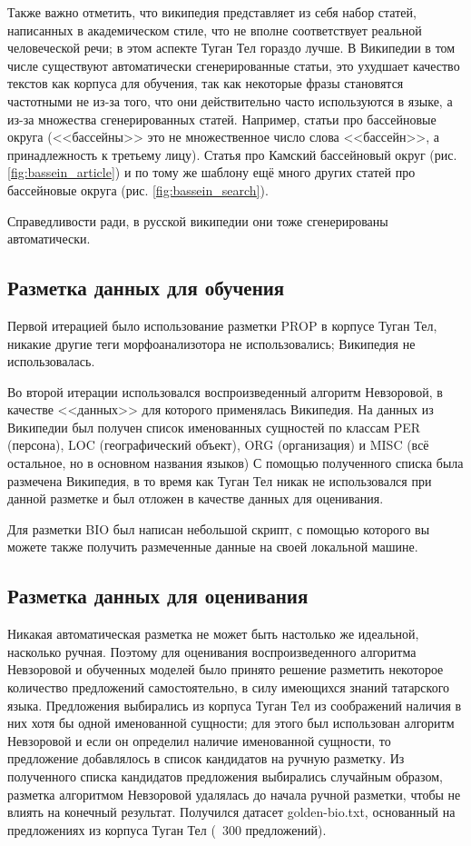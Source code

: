 Также важно отметить, что википедия представляет из себя набор статей, написанных в академическом стиле, что не вполне соответствует реальной человеческой речи; в этом аспекте Туган Тел гораздо лучше. В Википедии в том числе существуют автоматически сгенерированные статьи, это ухудшает качество текстов как корпуса для обучения, так как некоторые фразы становятся частотными не из-за того, что они действительно часто используются в языке, а из-за множества сгенерированных статей. Например, статьи про бассейновые округа (<<бассейны>> это не множественное число слова <<бассейн>>, а принадлежность к третьему лицу). Статья про Камский бассейновый округ (рис. \ref{fig:bassein_article}) и по тому же шаблону ещё много других статей про бассейновые округа (рис. \ref{fig:bassein_search}).

Справедливости ради, в русской википедии они тоже сгенерированы автоматически.

\subsection{Разметка данных для обучения}

Первой итерацией было использование разметки PROP в корпусе Туган Тел, никакие другие теги морфоанализотора не использовались; Википедия не использовалась. 

Во второй итерации использовался воспроизведенный алгоритм Невзоровой, в качестве <<данных>> для которого применялась Википедия. На данных из Википедии был получен список именованных сущностей по классам PER (персона), LOC (географический объект), ORG (организация) и MISC (всё остальное, но в основном названия языков) С помощью полученного списка была размечена Википедия, в то время как Туган Тел никак не использовался при данной разметке и был отложен в качестве данных для оценивания.

Для разметки BIO был написан небольшой скрипт, с помощью которого вы можете также получить размеченные данные на своей локальной машине.

\subsection{Разметка данных для оценивания}

Никакая автоматическая разметка не может быть настолько же идеальной, насколько ручная. Поэтому для оценивания воспроизведенного алгоритма Невзоровой и обученных моделей было принято решение разметить некоторое количество предложений самостоятельно, в силу имеющихся знаний татарского языка. Предложения выбирались из корпуса Туган Тел из соображений наличия в них хотя бы одной именованной сущности; для этого был использован алгоритм Невзоровой и если он определил наличие именованной сущности, то предложение добавлялось в список кандидатов на ручную разметку. Из полученного списка кандидатов предложения выбирались случайным образом, разметка алгоритмом Невзоровой удалялась до начала ручной разметки, чтобы не влиять на конечный результат. Получился датасет golden-bio.txt, основанный на предложениях из корпуса Туган Тел (~300 предложений).

